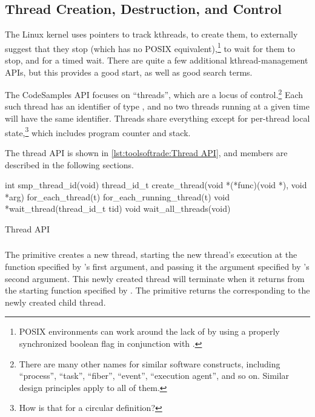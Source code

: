 \subsection{Thread Creation, Destruction, and Control}
\label{sec:toolsoftrade:Thread Creation; Destruction; and Control}

The Linux kernel uses
 pointers to track kthreads,
 to create them,
 to externally suggest that they stop
(which has no POSIX equivalent),\footnote{
	POSIX environments can work around the lack of
	 by using a properly synchronized
	boolean flag in conjunction with .}
 to wait for them to stop, and
 for a timed wait.
There are quite a few additional kthread-management APIs, but this
provides a good start, as well as good search terms.

The CodeSamples API focuses on ``threads'', which are a locus of
control.\footnote{
	There are many other names for similar software constructs, including
	``process'', ``task'', ``fiber'', ``event'', ``execution agent'',
	and so on.
	Similar design principles apply to all of them.}
Each such thread has an identifier of type ,
and no two threads running at a given time will have the same
identifier.
Threads share everything except for per-thread local state,\footnote{
	How is that for a circular definition?}
which includes program counter and stack.

The thread API is shown in
\cref{lst:toolsoftrade:Thread API}, and members are described in the
following sections.

\begin{listing}
\begin{VerbatimL}[numbers=none,xleftmargin=2pt]
int smp_thread_id(void)
thread_id_t create_thread(void *(*func)(void *), void *arg)
for_each_thread(t)
for_each_running_thread(t)
void *wait_thread(thread_id_t tid)
void wait_all_threads(void)
\end{VerbatimL}
\caption{Thread API}
\label{lst:toolsoftrade:Thread API}
\end{listing}

\subsubsection{}

The  primitive creates a new thread,
starting the new thread's execution
at the function  specified by 's
first argument, and passing it the argument specified by
's second argument.
This newly created thread will terminate when it returns from the
starting function specified by .
The  primitive returns the 
corresponding to the newly created child thread.

